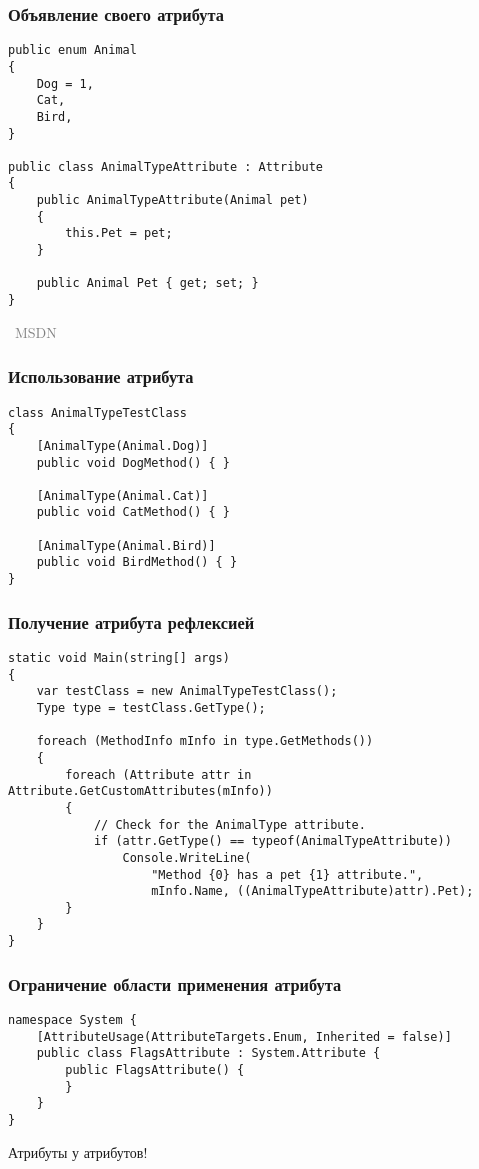 \documentclass[xetex,mathserif,serif]{beamer}
\newcommand{\attribution}[1] {
\vspace{-5mm}\begin{flushright}\begin{scriptsize}\textcolor{gray}{\textcopyright\, #1}\end{scriptsize}\end{flushright}
}
\begin{document}
    \begin{frame}[fragile]
        \frametitle{Объявление своего атрибута}
        \begin{footnotesize}
            \begin{verbatim}
public enum Animal
{
    Dog = 1,
    Cat,
    Bird,
}

public class AnimalTypeAttribute : Attribute
{
    public AnimalTypeAttribute(Animal pet)
    {
        this.Pet = pet;
    }

    public Animal Pet { get; set; }
}
            \end{verbatim}
        \end{footnotesize}
        \attribution{MSDN}
    \end{frame}

    \begin{frame}[fragile]
        \frametitle{Использование атрибута}
        \begin{verbatim}
class AnimalTypeTestClass
{
    [AnimalType(Animal.Dog)]
    public void DogMethod() { }

    [AnimalType(Animal.Cat)]
    public void CatMethod() { }

    [AnimalType(Animal.Bird)]
    public void BirdMethod() { }
}
        \end{verbatim}
    \end{frame}

    \begin{frame}[fragile]
        \frametitle{Получение атрибута рефлексией}
        \begin{footnotesize}
            \begin{verbatim}
static void Main(string[] args)
{
    var testClass = new AnimalTypeTestClass();
    Type type = testClass.GetType();

    foreach (MethodInfo mInfo in type.GetMethods())
    {
        foreach (Attribute attr in Attribute.GetCustomAttributes(mInfo))
        {
            // Check for the AnimalType attribute.
            if (attr.GetType() == typeof(AnimalTypeAttribute))
                Console.WriteLine(
                    "Method {0} has a pet {1} attribute.",
                    mInfo.Name, ((AnimalTypeAttribute)attr).Pet);
        }
    }
}
            \end{verbatim}
        \end{footnotesize}
    \end{frame}

    \begin{frame}[fragile]
        \frametitle{Ограничение области применения атрибута}
        \begin{verbatim}
namespace System {
    [AttributeUsage(AttributeTargets.Enum, Inherited = false)]
    public class FlagsAttribute : System.Attribute {
        public FlagsAttribute() {
        }
    }
}
        \end{verbatim}
        Атрибуты у атрибутов!
    \end{frame}
\end{document}
